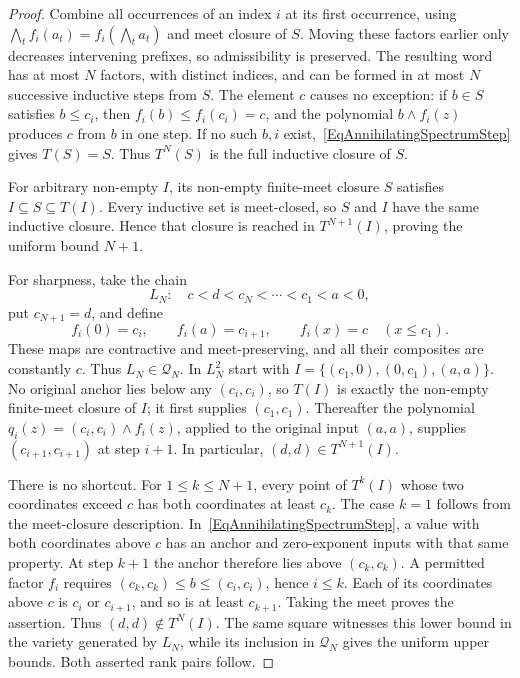 \documentclass[12pt,english]{amsart}
\theoremstyle{definition}
\numberwithin{equation}{section}
\theoremstyle{remark}
\begin{document}
\begin{proof}
Combine all occurrences of an index $i$ at its first occurrence, using
$\bigwedge_t f_i(a_t)=f_i(\bigwedge_t a_t)$ and meet closure of $S$.
Moving these factors earlier only decreases intervening prefixes, so
admissibility is preserved. The resulting word has at most $N$ factors,
with distinct indices, and can be formed in at most $N$ successive
inductive steps from $S$.
The element $c$ causes no exception: if $b\in S$ satisfies
$b\leqslant c_i$, then $f_i(b)\leqslant f_i(c_i)=c$, and the polynomial
$b\wedge f_i(z)$ produces $c$ from $b$ in one step. If no such $b,i$
exist,~\eqref{EqAnnihilatingSpectrumStep} gives $T(S)=S$.
Thus $T^N(S)$ is the full inductive closure of $S$.

For arbitrary non-empty $I$, its non-empty finite-meet closure $S$
satisfies $I\subseteq S\subseteq T(I)$. Every inductive set is
meet-closed, so $S$ and $I$ have the same inductive closure. Hence that
closure is reached in $T^{N+1}(I)$, proving the uniform bound $N+1$.

For sharpness, take the chain
\[
L_N:\quad c<d<c_N<\cdots<c_1<a<0,
\]
put $c_{N+1}=d$, and define
\[
f_i(0)=c_i,\qquad f_i(a)=c_{i+1},\qquad
f_i(x)=c\quad(x\leqslant c_1).
\]
These maps are contractive and meet-preserving, and all their composites
are constantly $c$. Thus $L_N\in\mathcal Q_N$.
In $L_N^2$ start with
$I=\{(c_1,0),(0,c_1),(a,a)\}$.
No original anchor lies below any $(c_i,c_i)$, so $T(I)$ is exactly the
non-empty finite-meet closure of $I$; it first supplies $(c_1,c_1)$.
Thereafter the polynomial
$q_i(z)=(c_i,c_i)\wedge f_i(z)$, applied to the original input $(a,a)$,
supplies $(c_{i+1},c_{i+1})$ at step $i+1$.
In particular, $(d,d)\in T^{N+1}(I)$.

There is no shortcut. For $1\leqslant k\leqslant N+1$, every point of
$T^k(I)$ whose two coordinates exceed $c$ has both coordinates at least
$c_k$. The case $k=1$ follows from the meet-closure description.
In~\eqref{EqAnnihilatingSpectrumStep}, a value with both coordinates
above $c$ has an anchor and zero-exponent inputs with that same property.
At step $k+1$ the anchor therefore lies above $(c_k,c_k)$.
A permitted factor $f_i$ requires
$(c_k,c_k)\leqslant b\leqslant(c_i,c_i)$, hence $i\leqslant k$.
Each of its coordinates above $c$ is $c_i$ or $c_{i+1}$, and so is at
least $c_{k+1}$. Taking the meet proves the assertion.
Thus $(d,d)\notin T^N(I)$. The same square witnesses this lower bound
in the variety generated by $L_N$, while its inclusion in $\mathcal Q_N$
gives the uniform upper bounds. Both asserted rank pairs follow.
\end{proof}
\end{document}
